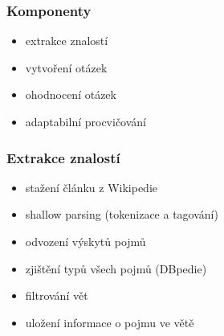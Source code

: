 \documentclass[xcolor=svgnames]{beamer}
\begin{document}
{
\begin{frame}[plain]
\end{frame}
}
\begin{frame}
\frametitle{Komponenty}
\begin{itemize}
\item extrakce znalostí
\item vytvoření otázek
\item ohodnocení otázek
\item adaptabilní procvičování
\end{itemize}
\end{frame}
\begin{frame}
\frametitle{Extrakce znalostí}
\begin{itemize}
\item stažení článku z Wikipedie
\item shallow parsing (tokenizace a tagování)
\item odvození výskytů pojmů
\item zjištění typů všech pojmů (DBpedie)
\item filtrování vět
\item uložení informace o pojmu ve větě
\end{itemize}
\end{frame}
\end{document}
